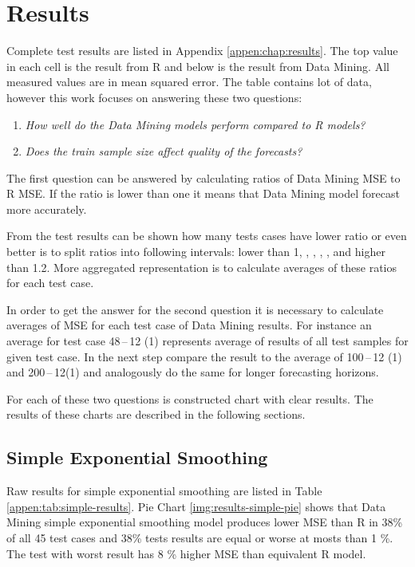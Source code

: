     \section{Results}
    Complete test results are listed in Appendix \ref{appen:chap:results}. The top value in each cell is the result
    from R and below is the result from Data Mining. All measured values are in mean squared error. The table contains
    lot of data, however this work focuses on answering these two questions:

    \begin{enumerate}
        \item \emph{How well do the Data Mining models perform compared to R models?} \label{itm:question2}
        \item \emph{Does the train sample size affect quality of the forecasts?} \label{itm:question1}
    \end{enumerate}

    The first question can be answered by calculating ratios of Data Mining MSE to R MSE. If the ratio is lower than
    one it means that Data Mining model forecast more accurately.

    From the test results can be shown how many tests cases have lower ratio or even better is to split ratios into
    following intervals:
    lower than 1, \interval[{1,1.01}], \interval[{1.01,1.05}], \interval[{1.05,1.10}], \interval[{1.1,1.2}],
    and higher than 1.2. More aggregated representation is to calculate averages of these ratios for each test case.

    In order to get the answer for the second question it is necessary to calculate averages of MSE for each test case
    of Data Mining results. For instance an average for test case 48\,--\,12 (1) represents average of results of all
    test samples for given test case. In the next step compare the result to the average of 100\,--\,12 (1)
    and 200\,--\,12(1) and analogously do the same for longer forecasting horizons.

    For each of these two questions is constructed chart with clear results. The results of these charts are
    described in the following sections.

        \subsection{Simple Exponential Smoothing} \label{sec:results-simple}
        Raw results for simple exponential smoothing are listed in Table \ref{appen:tab:simple-results}.
        Pie Chart \ref{img:results-simple-pie} shows that Data Mining simple exponential smoothing model produces
        lower MSE than R in 38\% of all 45 test cases and 38\% tests results are equal or worse at mosts than 1 \%.
        The test with worst result has 8 \% higher MSE than equivalent R model.

